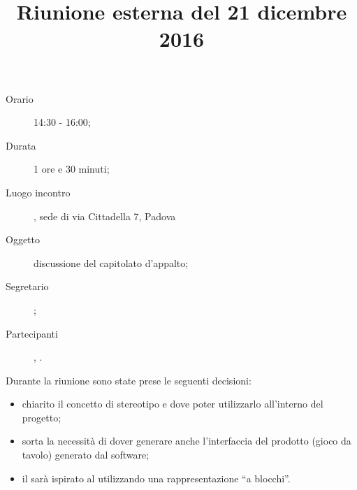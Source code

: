


\author{\PB}
\supervisor{\MM}
\title{Riunione esterna del 21 dicembre 2016}



\maketitle

\begin{description}
	\item[Orario] 14:30 - 16:00;
	\item[Durata] 1 ore e 30 minuti;
	\item[Luogo incontro] \ZU, sede di via Cittadella 7, Padova
	\item[Oggetto] discussione del capitolato d'appalto;
	\item[Segretario] \AZ; 
	\item[Partecipanti] \GP, \ALL.
\end{description}

Durante la riunione sono state prese le seguenti decisioni:
\begin{itemize}
\item chiarito il concetto di stereotipo e dove poter utilizzarlo all'interno del progetto;
\item sorta la necessità di dover generare anche l'interfaccia del prodotto (gioco da tavolo) generato dal software;
\item il  sarà ispirato al  utilizzando una rappresentazione “a blocchi”.
\end{itemize}

